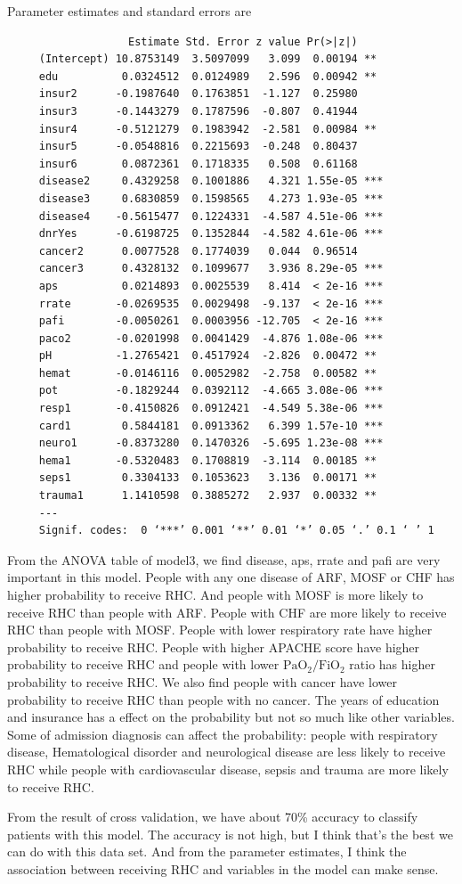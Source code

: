 \documentclass{article}
\begin{document}
Parameter estimates and standard errors are
\begin{verbatim}
                   Estimate Std. Error z value Pr(>|z|)    
     (Intercept) 10.8753149  3.5097099   3.099  0.00194 ** 
     edu          0.0324512  0.0124989   2.596  0.00942 ** 
     insur2      -0.1987640  0.1763851  -1.127  0.25980    
     insur3      -0.1443279  0.1787596  -0.807  0.41944    
     insur4      -0.5121279  0.1983942  -2.581  0.00984 ** 
     insur5      -0.0548816  0.2215693  -0.248  0.80437    
     insur6       0.0872361  0.1718335   0.508  0.61168    
     disease2     0.4329258  0.1001886   4.321 1.55e-05 ***
     disease3     0.6830859  0.1598565   4.273 1.93e-05 ***
     disease4    -0.5615477  0.1224331  -4.587 4.51e-06 ***
     dnrYes      -0.6198725  0.1352844  -4.582 4.61e-06 ***
     cancer2      0.0077528  0.1774039   0.044  0.96514    
     cancer3      0.4328132  0.1099677   3.936 8.29e-05 ***
     aps          0.0214893  0.0025539   8.414  < 2e-16 ***
     rrate       -0.0269535  0.0029498  -9.137  < 2e-16 ***
     pafi        -0.0050261  0.0003956 -12.705  < 2e-16 ***
     paco2       -0.0201998  0.0041429  -4.876 1.08e-06 ***
     pH          -1.2765421  0.4517924  -2.826  0.00472 ** 
     hemat       -0.0146116  0.0052982  -2.758  0.00582 ** 
     pot         -0.1829244  0.0392112  -4.665 3.08e-06 ***
     resp1       -0.4150826  0.0912421  -4.549 5.38e-06 ***
     card1        0.5844181  0.0913362   6.399 1.57e-10 ***
     neuro1      -0.8373280  0.1470326  -5.695 1.23e-08 ***
     hema1       -0.5320483  0.1708819  -3.114  0.00185 ** 
     seps1        0.3304133  0.1053623   3.136  0.00171 ** 
     trauma1      1.1410598  0.3885272   2.937  0.00332 ** 
     ---
     Signif. codes:  0 ‘***’ 0.001 ‘**’ 0.01 ‘*’ 0.05 ‘.’ 0.1 ‘ ’ 1
\end{verbatim}

From the ANOVA table of model3, we find disease, aps, rrate and pafi are very important in this model. People with any one disease of ARF, MOSF or CHF has higher probability to receive RHC. And people with MOSF is more likely to receive RHC than people with ARF. People with CHF are more likely to receive RHC than people with MOSF. People with lower respiratory rate have higher probability to receive RHC. People with higher APACHE score have higher probability to receive RHC and people with lower $\mathrm{PaO}_2/\mathrm{FiO}_2$ ratio has higher probability to receive RHC.  We also find people with cancer have lower probability to receive RHC than people with no cancer. The years of education and insurance has a effect on the probability but not so much like other variables. Some of admission diagnosis can affect the probability: people with respiratory disease, Hematological disorder and neurological disease are less likely to receive RHC while people with cardiovascular disease, sepsis and trauma are more likely to receive RHC.

From the result of cross validation, we have about 70\% accuracy to classify patients with this model. The accuracy is not high, but I think that's the best we can do with this data set. And from the parameter estimates, I think the association between receiving RHC and variables in the model can make sense.


	
	
\end{document}
